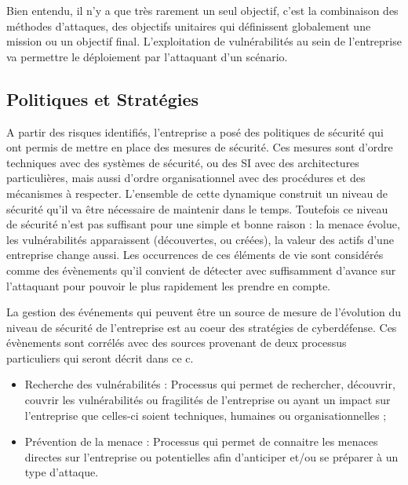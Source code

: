 Bien entendu, il n’y a que très rarement un seul objectif, c’est la combinaison des méthodes d’attaques, des objectifs unitaires qui définissent globalement une mission ou un objectif final. L’exploitation de vulnérabilités au sein de l’entreprise va permettre le déploiement par l’attaquant d’un scénario.

\subsection{Politiques et Stratégies}


A partir des risques identifiés, l’entreprise a posé des politiques de sécurité qui ont permis de mettre en place des mesures de sécurité. Ces mesures sont d’ordre techniques avec des systèmes de sécurité, ou des SI avec des architectures particulières, mais aussi d’ordre organisationnel avec des procédures et des mécanismes à respecter.
L’ensemble de cette dynamique construit un niveau de sécurité qu’il va être nécessaire de maintenir dans le temps. Toutefois ce niveau de sécurité n’est pas suffisant pour une simple et bonne raison : la menace évolue, les vulnérabilités apparaissent (découvertes, ou créées), la valeur des actifs d’une entreprise change aussi. 
Les occurrences de ces éléments de vie sont considérés comme des évènements qu’il convient de détecter avec suffisamment d’avance sur l’attaquant pour pouvoir le plus rapidement les prendre en compte.

La gestion des événements qui peuvent être un source de mesure de l’évolution du niveau de sécurité de l’entreprise est au coeur des stratégies de cyberdéfense. Ces évènements sont corrélés avec des sources provenant de deux processus particuliers qui seront décrit dans ce c\edoc.

\begin{itemize}
\item Recherche des vulnérabilités : Processus qui permet de rechercher, découvrir, couvrir les vulnérabilités ou fragilités de l’entreprise ou ayant un impact sur l’entreprise que celles-ci soient techniques, humaines ou organisationnelles ;
\item Prévention de la menace : Processus qui permet de connaitre les menaces directes sur l’entreprise ou potentielles afin d’anticiper et/ou se préparer à un type d’attaque.
\end{itemize}

